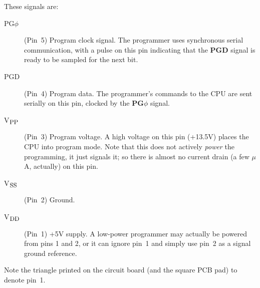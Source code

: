 \documentclass[12pt]{article}
\begin{document}
\noindent These signals are:
\begin{description}
\item[PG$\phi$] (Pin~5) Program clock signal.  The programmer uses
synchronous serial communication, with a pulse on this pin indicating
that the {\bf PGD} signal is ready to be sampled for the next bit.
\item[PGD] (Pin~4) Program data.  The programmer's commands to the CPU are
sent serially on this pin, clocked by the {\bf PG$\phi$} signal.
\item[V$_{\hbox{\small PP}}$] (Pin~3) Program voltage.  A high voltage on
this pin (+13.5V) places the CPU into program mode.  Note that this does not
actively \emph{power} the programming, it just signals it; so there is almost
no current drain (a few $\mu$A, actually) on this pin.
\item[V$_{\hbox{\small SS}}$] (Pin~2) Ground.
\item[V$_{\hbox{\small DD}}$] (Pin~1) +5V supply.  A low-power programmer may
actually be powered from pins 1 and 2, or it can ignore pin~1 and simply use
pin~2 as a signal ground reference.
\end{description}

Note the triangle printed on the circuit board (and the square PCB pad) to denote pin~1.
\end{document}
